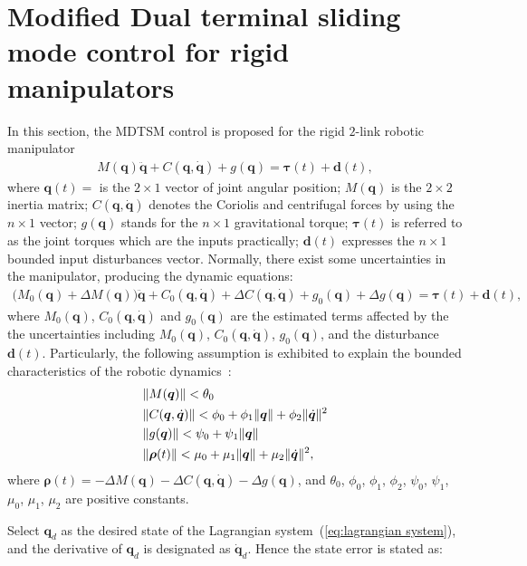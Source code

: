 \documentclass[3p]{elsarticle}
\theoremstyle{plain}
\theoremstyle{remark}
\begin{document}
\section{Modified Dual terminal sliding mode control for rigid manipulators}\label{sec:3}
In this section, the MDTSM control is proposed for the rigid $2$-link robotic manipulator
\begin{align}
M(\bm q)\ddot {\bm q}+C(\bm q,\dot {\bm q})+g(\bm q)= \bm\tau(t)+{\bm d}(t),\label{eq:lagrangian system}
\end{align}
where $\bm q(t) = $ is the $2\times 1$ vector of joint angular position; ${M(\bm q)}$ is the $2\times 2$ inertia matrix; ${C(\bm q,\dot{\bm q})}$ denotes the Coriolis and centrifugal forces by using the $n\times1$ vector; ${g(\bm q)}$ stands for the $n\times 1$ gravitational torque; $\bm{\tau}(t)$ is referred to as the joint torques which are the inputs practically; $\bm d(t)$ expresses the $n\times 1$ bounded input disturbances vector. Normally, there exist some uncertainties in the manipulator, producing the dynamic equations:
\begin{align}
(M_0(\bm q)+\Delta {M(\bm q))\ddot {\bm q}}+{C_0(\bm q,\dot {\bm q})+\Delta C(\bm q,\dot {\bm q})}+g_0(\bm q)+\Delta g(\bm q)=\bm {\tau}(t)+\bm{d}(t),
\end{align}
where $M_0(\bm q)$, $C_0(\bm q,\dot {\bm q})$ and $g_0(\bm q)$ are the estimated terms affected by the the uncertainties including $M_0(\bm q)$, $C_0(\bm q,\dot {\bm q})$, $g_0(\bm q)$, and the disturbance $\bm{d}(t)$. Particularly, the following assumption is exhibited to explain the bounded characteristics of the robotic dynamics~\cite{feng2002non}:
\begin{align}
&\Vert M(\bm q)\Vert< \theta_0\notag\\
&\Vert C(\bm q,\dot {\bm q})\Vert< \phi_0+\phi_1\Vert\bm q\Vert+\phi_2\Vert\dot{\bm q}\Vert^2\notag\\
&\Vert g(\bm q)\Vert< \psi_0+\psi_1\Vert\bm q\notag\Vert\\
&\Vert \bm {\rho}(t)\Vert< \mu_0+\mu_1\Vert\bm q\Vert+\mu_2\Vert\dot{\bm q}\Vert^2,\label{eq:manipulator uncertainty}
\end{align}
where $\bm {\rho}(t) = -\Delta M(\bm q)-\Delta C(\bm q,\dot {\bm q})-\Delta g(\bm q)$, and $\theta_0$, $\phi_0$, $\phi_1$, $\phi_2$, $\psi_0$, $\psi_1$, $\mu_0$, $\mu_1$, $\mu_2$ are positive constants.\par
Select $\bm q_d$ as the desired state of the Lagrangian system~(\ref{eq:lagrangian system}), and the derivative of $\bm q_d$ is designated as $\dot {\bm q}_d$. Hence the state error is stated as:
\end{document}
